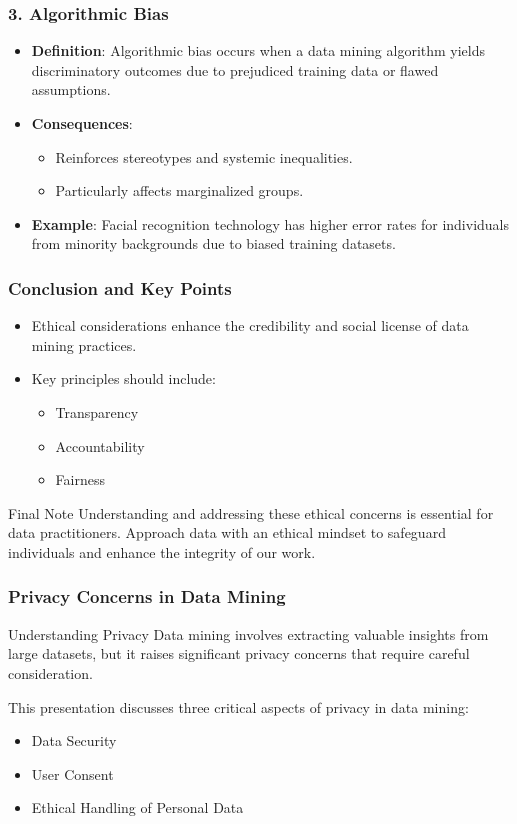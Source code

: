 \documentclass[aspectratio=169]{beamer}
\begin{document}
\begin{frame}[fragile]
    \frametitle{3. Algorithmic Bias}
    \begin{itemize}
        \item \textbf{Definition}: Algorithmic bias occurs when a data mining algorithm yields discriminatory outcomes due to prejudiced training data or flawed assumptions.
        \item \textbf{Consequences}: 
        \begin{itemize}
            \item Reinforces stereotypes and systemic inequalities.
            \item Particularly affects marginalized groups.
        \end{itemize}
        \item \textbf{Example}: Facial recognition technology has higher error rates for individuals from minority backgrounds due to biased training datasets.
    \end{itemize}
\end{frame}

\begin{frame}[fragile]
    \frametitle{Conclusion and Key Points}
    \begin{itemize}
        \item Ethical considerations enhance the credibility and social license of data mining practices.
        \item Key principles should include:
        \begin{itemize}
            \item Transparency
            \item Accountability
            \item Fairness
        \end{itemize}
    \end{itemize}
    \begin{block}{Final Note}
        Understanding and addressing these ethical concerns is essential for data practitioners. 
        Approach data with an ethical mindset to safeguard individuals and enhance the integrity of our work.
    \end{block}
\end{frame}

\begin{frame}[fragile]
    \frametitle{Privacy Concerns in Data Mining}
    \begin{block}{Understanding Privacy}
        Data mining involves extracting valuable insights from large datasets, but it raises significant privacy concerns that require careful consideration.
    \end{block}
    This presentation discusses three critical aspects of privacy in data mining:
    \begin{itemize}
        \item Data Security
        \item User Consent
        \item Ethical Handling of Personal Data
    \end{itemize}
\end{frame}
\end{document}
